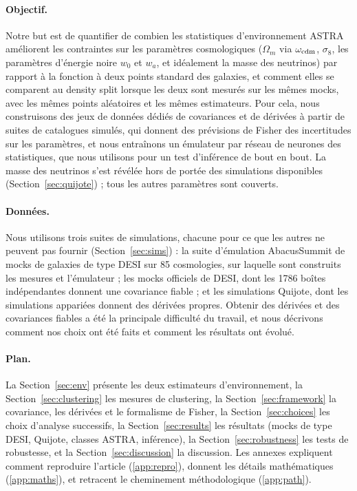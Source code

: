 \paragraph{Objectif.} Notre but est de quantifier de combien les statistiques d'environnement ASTRA améliorent les contraintes sur les paramètres cosmologiques ($\Omega_m$ via $\omega_{\rm cdm}$, $\sigma_8$, les paramètres d'énergie noire $w_0$ et $w_a$, et idéalement la masse des neutrinos) par rapport à la fonction à deux points standard des galaxies, et comment elles se comparent au density split lorsque les deux sont mesurés sur les mêmes mocks, avec les mêmes points aléatoires et les mêmes estimateurs. Pour cela, nous construisons des jeux de données dédiés de covariances et de dérivées à partir de suites de catalogues simulés, qui donnent des prévisions de Fisher des incertitudes sur les paramètres, et nous entraînons un émulateur par réseau de neurones des statistiques, que nous utilisons pour un test d'inférence de bout en bout. La masse des neutrinos s'est révélée hors de portée des simulations disponibles (Section~\ref{sec:quijote}) ; tous les autres paramètres sont couverts.

\paragraph{Données.} Nous utilisons trois suites de simulations, chacune pour ce que les autres ne peuvent pas fournir (Section~\ref{sec:sims}) : la suite d'émulation AbacusSummit de mocks de galaxies de type DESI sur 85 cosmologies, sur laquelle sont construits les mesures et l'émulateur ; les mocks officiels de DESI, dont les 1786 boîtes indépendantes donnent une covariance fiable ; et les simulations Quijote, dont les simulations appariées donnent des dérivées propres. Obtenir des dérivées et des covariances fiables a été la principale difficulté du travail, et nous décrivons comment nos choix ont été faits et comment les résultats ont évolué.

\paragraph{Plan.} La Section~\ref{sec:env} présente les deux estimateurs d'environnement, la Section~\ref{sec:clustering} les mesures de clustering, la Section~\ref{sec:framework} la covariance, les dérivées et le formalisme de Fisher, la Section~\ref{sec:choices} les choix d'analyse successifs, la Section~\ref{sec:results} les résultats (mocks de type DESI, Quijote, classes ASTRA, inférence), la Section~\ref{sec:robustness} les tests de robustesse, et la Section~\ref{sec:discussion} la discussion. Les annexes expliquent comment reproduire l'article (\ref{app:repro}), donnent les détails mathématiques (\ref{app:maths}), et retracent le cheminement méthodologique (\ref{app:path}).
